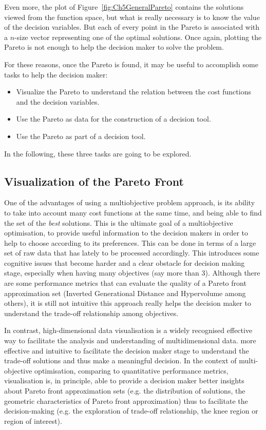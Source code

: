 Even more, the plot of Figure~\ref{fig:Ch5GeneralPareto} contains the solutions viewed from the function space, but what is really necessary is to know the value of the decision variables. But each of every point in the Pareto is associated with a $n$-size vector representing one of the optimal solutions. Once again, plotting the Pareto is not enough to help the decision maker to solve the problem.

For these reasons, once the Pareto is found, it may be useful to accomplish some tasks to help the decision maker:
\begin{itemize}
	\item  Visualize the Pareto to understand the relation between the cost functions and the decision variables.
	\item Use the Pareto as data for the construction of a decision tool.
	\item Use the Pareto as part of a decision tool.
\end{itemize}
In the following, these three tasks are going to be explored.
%
\subsection{Visualization of the Pareto Front}
\label{sec:ParetoVisualization}
%
One of the advantages of using a multiobjective problem approach, is its ability to take into account many cost functions at the same time, and being able to find the set of the \emph{best} solutions. This is the ultimate goal of a multiobjective optimisation, to provide useful information to the decision makers in order to help to choose according to its preferences. This can be done in terms of a large set of raw data that has lately to be processed accordingly. This introduces some cognitive issues that become harder and a clear obstacle for decision making stage, especially when having many objectives (say more than 3). Although there are some performance metrics that can evaluate the quality of a Pareto front approximation set (Inverted Generational Distance \citep{Bosman2003} and Hypervolume \citep{Zitzler1999} among others), it is still not intuitive this approach really helps the decision maker to understand the trade-off relationship among objectives.

In contrast, high-dimensional data visualisation is a widely recognised effective way to facilitate the analysis and understanding of multidimensional data. more effective and intuitive to facilitate the decision maker stage to understand the trade-off solutions and thus make a meaningful decision. In the context of multi-objective optimisation, comparing to quantitative performance metrics, visualisation is, in principle, able to provide a decision maker better insights about Pareto front approximation sets (e.g. the distribution of solutions, the geometric characteristics of Pareto front approximation) thus to facilitate the decision-making (e.g. the exploration of trade-off relationship, the knee region or region of interest).


